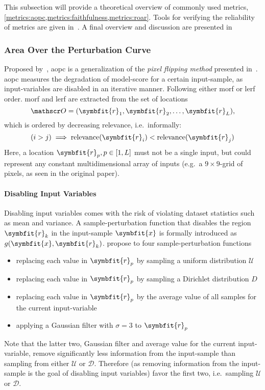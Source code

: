 This subsection will provide a theoretical overview of commonly used metrics, \cref{metrics:aopc,metrics:faithfulness,metrics:roar}. Tools for verifying the reliability of metrics are given in~. A final overview and discussion are presented in~

\subsubsection{Area Over the Perturbation Curve}\label{metrics:aopc} Proposed by~, \gls{aopc} is a generalization of the \textit{pixel flipping method} presented in~\cite[pp. 34ff.]{Bach.2015}. \gls{aopc} measures the degradation of model-score for a certain input-sample, as input-variables are disabled in an iterative manner. Following either \gls{morf} or \gls{lerf} order. \gls{morf} and \gls{lerf} are extracted from the set of locations \[ \mathscr O = (\symbfit{r}_1, \symbfit{r}_2, \dots, \symbfit{r}_L), \]  which is ordered by decreasing relevance, i.e.\ informally: \[(i > j) \implies \text{relevance}(\symbfit{r}_i) < \text{relevance}(\symbfit{r}_j) \] Here, a location \( \symbfit{r}_p, p \in [1, L] \) must not be a single input, but could represent any constant multidimensional array of inputs (e.g.\ a \( 9\times9 \)-grid of pixels, as seen in the original paper).

\paragraph{Disabling Input Variables}
Disabling input variables comes with the risk of violating dataset statistics such as mean and variance. A sample-perturbation function that disables the region \(\symbfit{r}_k\) in the input-sample \(\symbfit{x}\) is formally introduced as \(g(\symbfit{x}, \symbfit{r}_k)\). \citeauthor{WojciechSamek.2015} propose to four sample-perturbation functions
\begin{itemize}
    \item replacing each value in \(\symbfit{r}_p\) by sampling a uniform distribution \(\mathscr U\)
    \item replacing each value in \(\symbfit{r}_p\) by sampling a Dirichlet distribution \(D\)
    \item replacing each value in \(\symbfit{r}_p\) by the average value of all samples for the current input-variable
    \item applying a Gaussian filter with \(\sigma = 3\) to \(\symbfit{r}_p\)
\end{itemize}
Note that the latter two, Gaussian filter and average value for the current input-variable, remove significantly less information from the input-sample than sampling from either \(\mathscr U\) or \(\mathscr D\).  Therefore (as removing information from the input-sample is the goal of disabling input variables) \citeauthor{WojciechSamek.2015} favor the first two, i.e.\ sampling \(\mathscr U\) or \(\mathscr D\).


